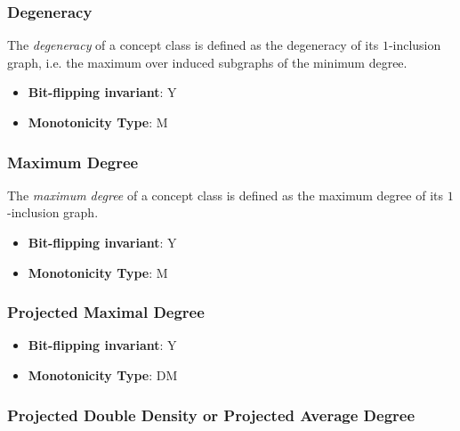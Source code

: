 \subsubsection{Degeneracy}
      
      \begin{definition}\label{def:degeneracy}
      The \emph{degeneracy} of a concept class is defined as the degeneracy of its $1$-inclusion graph, i.e. the maximum over induced subgraphs of the minimum degree.
      \end{definition}
      \begin{itemize}
      \item {\bf Bit-flipping invariant}: Y
      \item {\bf Monotonicity Type}: M
      \end{itemize}
\subsubsection{Maximum Degree}
      
      \begin{definition}\label{def:maximum_degree}
      The \emph{maximum degree} of a concept class is defined as the maximum degree of its $1$-inclusion graph.
      \end{definition}
      \begin{itemize}
      \item {\bf Bit-flipping invariant}: Y
      \item {\bf Monotonicity Type}: M
      \end{itemize}
\subsubsection{Projected Maximal Degree}
      
      \begin{definition}\label{def:projected_maximal_degree}
      
      \end{definition}
      \begin{itemize}
      \item {\bf Bit-flipping invariant}: Y
      \item {\bf Monotonicity Type}: DM
      \end{itemize}
\subsubsection{Projected Double Density or Projected Average Degree}
      
